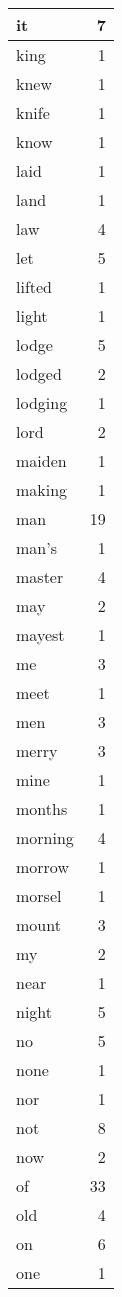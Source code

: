 \begin{center}
\begin{longtable}{l|r}
it & 7 \\ \hline
king & 1 \\ \hline
knew & 1 \\ \hline
knife & 1 \\ \hline
know & 1 \\ \hline
laid & 1 \\ \hline
land & 1 \\ \hline
law & 4 \\ \hline
let & 5 \\ \hline
lifted & 1 \\ \hline
light & 1 \\ \hline
lodge & 5 \\ \hline
lodged & 2 \\ \hline
lodging & 1 \\ \hline
lord & 2 \\ \hline
maiden & 1 \\ \hline
making & 1 \\ \hline
man & 19 \\ \hline
man's & 1 \\ \hline
master & 4 \\ \hline
may & 2 \\ \hline
mayest & 1 \\ \hline
me & 3 \\ \hline
meet & 1 \\ \hline
men & 3 \\ \hline
merry & 3 \\ \hline
mine & 1 \\ \hline
months & 1 \\ \hline
morning & 4 \\ \hline
morrow & 1 \\ \hline
morsel & 1 \\ \hline
mount & 3 \\ \hline
my & 2 \\ \hline
near & 1 \\ \hline
night & 5 \\ \hline
no & 5 \\ \hline
none & 1 \\ \hline
nor & 1 \\ \hline
not & 8 \\ \hline
now & 2 \\ \hline
of & 33 \\ \hline
old & 4 \\ \hline
on & 6 \\ \hline
one & 1 \\ \hline

\end{longtable}
\end{center}
